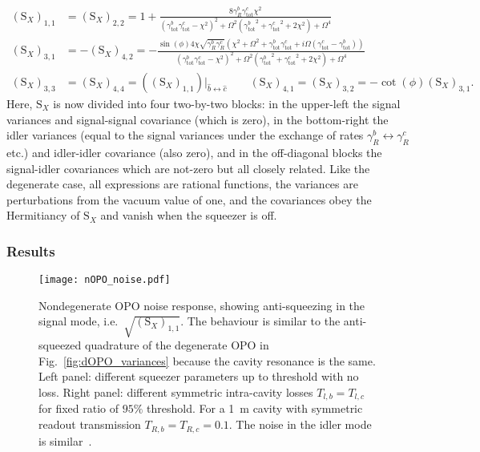 {\small
\begin{align}\label{eq:nOPO_full_freedom}
(\text{S}_X)_{1,1}&=(\text{S}_X)_{2,2}=1+\frac{8 \gamma^b_R {\gamma^c_\text{tot}} \chi ^2}{\left({\gamma^b_\text{tot}} {\gamma^c_\text{tot}}-\chi ^2\right)^2+\Omega ^2 \left({\gamma^b_\text{tot}}^2+{\gamma^c_\text{tot}}^2+2 \chi ^2\right)+\Omega ^4}\\
(\text{S}_X)_{3,1}&=-(\text{S}_X)_{4,2}= -\frac{\sin (\phi )4 \chi  \sqrt{\gamma^b_R \gamma^c_R}  \left(\chi ^2+\Omega^2+\gamma^b_\text{tot}\gamma^c_\text{tot}+i\Omega\left(\gamma^c_\text{tot}-\gamma^b_\text{tot}\right)\right)}{\left({\gamma^b_\text{tot}} {\gamma^c_\text{tot}}-\chi ^2\right)^2+\Omega ^2 \left({\gamma^b_\text{tot}}^2+{\gamma^c_\text{tot}}^2+2 \chi ^2\right)+\Omega ^4}\nonumber\\
(\text{S}_X)_{3,3}&=(\text{S}_X)_{4,4}=\left((\text{S}_X)_{1,1}\right)|_{\hat{b}\leftrightarrow \hat{c}}\qquad (\text{S}_X)_{4,1}=(\text{S}_X)_{3,2}= -\cot(\phi)(\text{S}_X)_{3,1}\nonumber.
\end{align}}%
Here, $\text{S}_X$ is now divided into four two-by-two blocks: in the upper-left the signal variances and signal-signal covariance (which is zero), in the bottom-right the idler variances (equal to the signal variances under the exchange of rates $\gamma^b_R\leftrightarrow\gamma^c_R$ etc.) and idler-idler covariance (also zero), and in the off-diagonal blocks the signal-idler covariances which are not-zero but all closely related. Like the degenerate case, all expressions are rational functions, the variances are perturbations from the vacuum value of one, and the covariances obey the Hermitiancy of $\text{S}_X$ and vanish when the squeezer is off. 

\subsubsection{Results} %
\label{sec:nOPO_results}

\begin{figure}
	\centering
	\texttt{[image: nOPO\_noise.pdf]}
	\caption{Nondegenerate OPO noise response, showing anti-squeezing in the signal mode, i.e.\ $\sqrt{(\text{S}_X)_{1,1}}$. The behaviour is similar to the anti-squeezed quadrature of the degenerate OPO in Fig.~\ref{fig:dOPO_variances} because the cavity resonance is the same. Left panel: different squeezer parameters up to threshold with no loss. Right panel: different symmetric intra-cavity losses $T_{l,b}=T_{l,c}$ for fixed ratio of $95\%$ threshold. For a 1~m cavity with symmetric readout transmission $T_{R,b}=T_{R,c}=0.1$. The noise in the idler mode is similar~\cite{}.}
	\label{fig:nOPO_variances}
\end{figure}

